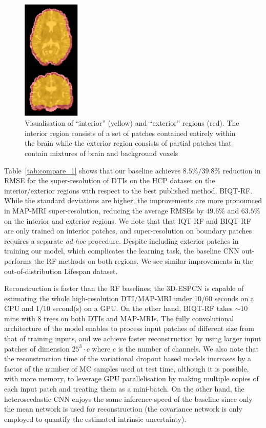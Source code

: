 \begin{figure}[t]
	\centering
	\includegraphics[width=2.75cm]{chapter_3/figures/fig_3_2.png}
	\small
	\caption{\footnotesize Visualisation of ``interior'' (yellow) and ``exterior'' regions (red). The interior region consists of a set of patches contained entirely within the brain while the exterior region consists of partial patches that contain mixtures of brain and background voxels} 
	\label{fig:mask}
\end{figure}

Table~\ref{tab:compare_1} shows that our baseline achieves $8.5\%/39.8\%$ reduction in RMSE for the super-resolution of DTIs on the HCP dataset on the interior/exterior regions with respect to the best published method, BIQT-RF\cite{tanno2016bayesian}. While the standard deviations are higher, the improvements are more pronounced in MAP-MRI super-resolution, reducing the average RMSEs by $49.6\%$ and $63.5\%$ on the interior and exterior regions. We note that that IQT-RF and BIQT-RF are only trained on interior patches, and super-resolution on boundary patches requires a separate \textit{ad hoc} procedure. Despite including exterior patches in training our model, which complicates the learning task, the baseline CNN out-performs the RF methods on both regions. We see similar improvements in the out-of-distribution Lifespan dataset.

Reconstruction is faster than the RF baselines; the 3D-ESPCN is capable of estimating the whole high-resolution DTI/MAP-MRI under 10/60 seconds on a CPU and $1/10$ second(s) on a GPU. On the other hand, BIQT-RF takes $\sim10$ mins with 8 trees on both DTIs and MAP-MRIs. The fully convolutional architecture of the model enables to process input patches of different size from that of training inputs, and we achieve faster reconstruction by using larger input patches of dimension $25^3\cdot c$ where $c$ is the number of channels. We also note that the reconstruction time of the variational dropout based models increases by a factor of the number of MC samples used at test time, although it is possible, with more memory, to leverage GPU parallelisation by making multiple copies of each input patch and treating them as a mini-batch. On the other hand, the heteroscedastic CNN enjoys the same inference speed of the baseline since only the mean network is used for reconstruction (the covariance network is only employed to quantify the estimated intrinsic uncertainty). 

